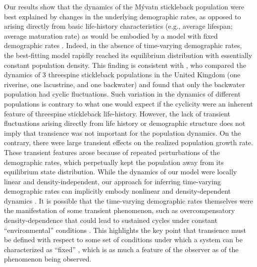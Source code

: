 \documentclass[11pt]{article}
\begin{document}
Our results show that the dynamics of the M\'{y}vatn stickleback population
were best explained by changes in the underlying demographic rates, 
as opposed to arising directly from basic life-history characteristics 
(e.g., average lifespan; average maturation rate) 
as would be embodied by a model with fixed demographic rates \citep{caswell2001matrix}.
Indeed, in the absence of time-varying demographic rates,
the best-fitting model rapidly reached its equilibrium distribution 
with essentially constant population density.
This finding is consistent with \cite{wootton2005},
who compared the dynamics of 3 threespine stickleback populations in the United Kingdom
(one riverine, one lacustrine, and one backwater)
and found that only the backwater population had cyclic fluctuations.
Such variation in the dynamics of different populations 
is contrary to what one would expect if the cyclicity were 
an inherent feature of threespine stickleback life-history.
However, the lack of transient fluctuations arising directly 
from life history or demographic structure
does not imply that transience was not important for the population dynamics.
On the contrary, 
there were large transient effects on the realized population growth rate.
These transient features arose because of repeated perturbations
of the demographic rates, which perpetually kept the population
away from its equilibrium state distribution.
While the dynamics of our model were locally linear and density-independent,
our approach for inferring time-varying demographic rates can implicitly embody
nonlinear and density-dependent dynamics \citep{ives2012}.
It is possible that the time-varying demographic rates themselves were the manifestation
of some transient phenomenon, 
such as overcompensatory density-dependence that could lead to sustained cycles under
constant ``environmental'' conditions
\citep[e.g.,][]{may1974}.
This highlights the key point that transience must be defined with respect to some 
set of conditions under which a system can be characterized as ``fixed''
\citep{hastings2010},
which is as much a feature of the observer as of the phenomenon being observed.
\end{document}
